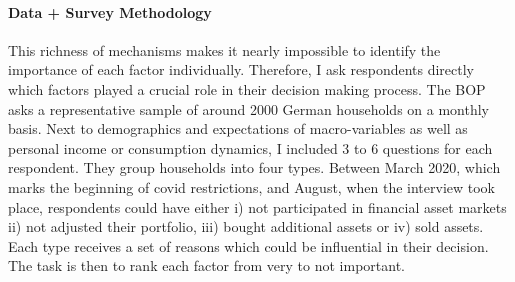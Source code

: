 \documentclass[ProjectABM]{subfiles}
\begin{document}










\paragraph{Data + Survey Methodology}
This richness of mechanisms makes it nearly impossible to identify the importance of each factor individually. Therefore, I ask respondents directly which factors played a crucial role in their decision making process. The BOP asks a representative sample of around 2000 German households on a monthly basis. Next to demographics and expectations of macro-variables as well as personal income or consumption dynamics, I included 3 to 6 questions for each respondent. They group households into four types. Between March 2020, which marks the beginning of covid restrictions, and August, when the interview took place, respondents could have either i) not participated in financial asset markets ii) not adjusted their portfolio, iii) bought additional assets or iv) sold assets. Each type receives a set of reasons which could be influential in their decision. The task is then to rank each factor from very to not important.
\end{document}
